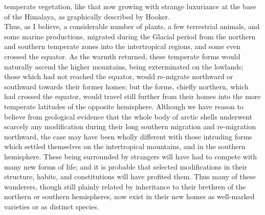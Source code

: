 temperate vegetation, like that now growing with strange luxuriance at the base of the Himalaya, as graphically described by Hooker.~\\
\indent Thus, as I believe, a considerable number of plants, a few terrestrial animals, and some marine productions, migrated during the Glacial period from the northern and southern temperate zones into the intertropical regions, and some even crossed the equator. As the warmth returned, these temperate forms would naturally ascend the higher mountains, being exterminated on the lowlands; those which had not reached the equator, would re-migrate northward or southward towards their former homes; but the forms, chiefly northern, which had crossed the equator, would travel still further from their homes into the more temperate latitudes of the opposite hemisphere.  Although we have reason to believe from geological evidence that the whole body of arctic shells underwent scarcely any modification during their long southern migration and re-migration northward, the case may have been wholly different with those intruding forms which settled themselves on the intertropical mountains, and in the southern hemisphere. These being surrounded by strangers will have had to compete with many new forms of life; and it is probable that selected modifications in their structure, habits, and constitutions will have profited them. Thus many of these wanderers, though still plainly related by inheritance to their brethren of the northern or southern hemispheres, now exist in their new homes as well-marked varieties or as distinct species.~\\
